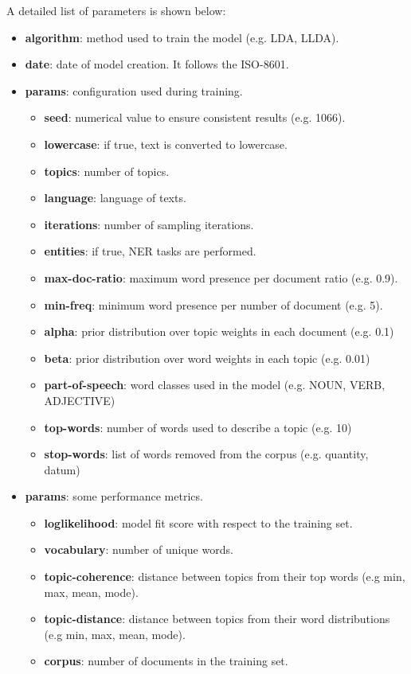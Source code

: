 A detailed list of parameters is shown below:
\begin{itemize}
\item \textbf{algorithm}: method used to train the model (e.g. LDA, LLDA).
\item \textbf{date}: date of model creation. It follows the ISO-8601.
\item \textbf{params}: configuration used during training.
	\begin{itemize}
	\item \textbf{seed}: numerical value to ensure consistent results (e.g. 1066).
	\item \textbf{lowercase}: if true, text is converted to lowercase.
	\item \textbf{topics}: number of topics.
	\item \textbf{language}: language of texts.
	\item \textbf{iterations}: number of sampling iterations.
	\item \textbf{entities}: if true, NER tasks are performed.
	\item \textbf{max-doc-ratio}: maximum word presence per document ratio (e.g. 0.9).
	\item \textbf{min-freq}: minimum word presence per number of document (e.g. 5). 
	\item \textbf{alpha}: prior distribution over topic weights in each document (e.g. 0.1)
	\item \textbf{beta}: prior distribution over word weights in each topic (e.g. 0.01)
	\item \textbf{part-of-speech}: word classes used in the model (e.g. NOUN, VERB, ADJECTIVE)
	\item \textbf{top-words}: number of words used to describe a topic (e.g. 10)
	\item \textbf{stop-words}: list of words removed from the corpus (e.g. quantity, datum) 
	\end{itemize}
\item \textbf{params}: some performance metrics.
	\begin{itemize}
	\item \textbf{loglikelihood}: model fit score with respect to the training set.
	\item \textbf{vocabulary}: number of unique words.
	\item \textbf{topic-coherence}: distance between topics from their top words (e.g min, max, mean, mode).
	\item \textbf{topic-distance}: distance between topics from their word distributions (e.g min, max, mean, mode).
	\item \textbf{corpus}: number of documents in the training set. 
	\end{itemize}
\end{itemize}


